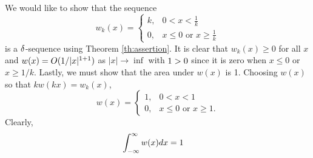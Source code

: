 \begin{example}
    We would like to show that the sequence
    \begin{equation*}
        w_k(x) = \begin{cases}
            k, &  0<x<\frac{1}{k}\\
            0, &x\leq 0 \text{ or } x \geq \frac{1}{k}
        \end{cases}
    \end{equation*}
    is a \(\delta\)-sequence using Theorem \ref{th:assertion}. It is clear that \(w_k(x)\geq 0\)  for all \(x\) and \(w(x)=O(1/|x|^{1+1})\) as \(|x| \rightarrow \inf\) with \(1>0\) since it is zero when \(x \leq 0\) or \(x \geq 1/k\). Lastly, we must show that the area under \(w(x)\) is 1. Choosing \(w(x)\) so that \(kw(kx)=w_k(x)\),
    \begin{equation*}
        w(x)=\begin{cases}
            1,& 0<x<1\\
            0,& x\leq0 \text{ or } x \geq 1.
        \end{cases}
    \end{equation*}
    Clearly,
    \begin{equation}
        \begin{split}
            \int_{-\infty}^{\infty} w(x) dx &=1
        \end{split}
    \end{equation}
\end{example}

